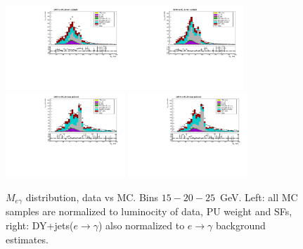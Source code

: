 \begin{figure}[htb]
\begin{center}
    \includegraphics[width=0.40\textwidth]{../figs/figs_v11/ELECTRON_WGamma/PrepareYields/c_TotalDATAvsMC_Barrel__Mpholep1PRELIMINARY_FOR_E_TO_GAMMA_WITH_PSV_CUT_pt20to25_.pdf}\includegraphics[width=0.40\textwidth]{../figs/figs_v11/ELECTRON_WGamma/PrepareYields/c_TotalDATAvsMC_Barrel__Mpholep1PRELIMINARY_FOR_E_TO_GAMMA_WITH_PSV_CUT_pt20to25__etogScale.pdf}\\
    \includegraphics[width=0.40\textwidth]{../figs/figs_v11/ELECTRON_WGamma/PrepareYields/c_TotalDATAvsMC_Endcap__Mpholep1PRELIMINARY_FOR_E_TO_GAMMA_WITH_PSV_CUT_pt20to25_.pdf} \includegraphics[width=0.40\textwidth]{../figs/figs_v11/ELECTRON_WGamma/PrepareYields/c_TotalDATAvsMC_Endcap__Mpholep1PRELIMINARY_FOR_E_TO_GAMMA_WITH_PSV_CUT_pt20to25__etogScale.pdf}\\
   \label{fig:Mpholep1DatavsMC_15to25}
  \caption{$M_{e\gamma}$ distribution, data vs MC. Bins $15-20-25$~GeV. Left: all MC samples are normalized to luminocity of data, PU weight and SFs, right: DY+jets($e\rightarrow\gamma$) also normalized to $e\rightarrow\gamma$ background estimates.}
  \end{center}
\end{figure}
